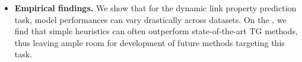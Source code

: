 \begin{itemize}
    

    \item \textbf{Empirical findings.} We show that for the dynamic link property prediction task, model performances can vary drastically across datasets.  On the , we find that simple heuristics can often outperform state-of-the-art TG methods, thus leaving ample room for development of future methods targeting this task. 
    

\end{itemize}
